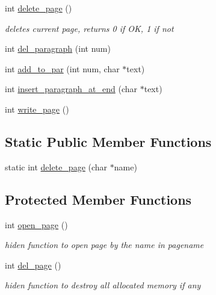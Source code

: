 \begin{DoxyCompactItemize}
\mbox{\label{classpage_ad3851ad84faf2677e8a50087e0627509}} 
int \hyperlink{classpage_ad3851ad84faf2677e8a50087e0627509}{delete\+\_\+page} ()
\begin{DoxyCompactList}\small\item\em deletes current page, returns 0 if OK, 1 if not \end{DoxyCompactList}\item 
int \hyperlink{classpage_a1c55a90abfcc823c8216c9dad7660f24}{del\+\_\+paragraph} (int num)
\item 
int \hyperlink{classpage_a03e597adceb2d5147a1729d6517df5b4}{add\+\_\+to\+\_\+par} (int num, char $\ast$text)
\item 
int \hyperlink{classpage_a5182baae92ba16e0d8ac1c1b97cda5c0}{insert\+\_\+paragraph\+\_\+at\+\_\+end} (char $\ast$text)
\item 
int \hyperlink{classpage_a5cbc74c74b3b2296bc76fe5496cff59f}{write\+\_\+page} ()
\end{DoxyCompactItemize}
\subsection*{Static Public Member Functions}
\begin{DoxyCompactItemize}
\item 
static int \hyperlink{classpage_a4030e9084e093da1687ed0a0ff34c9d2}{delete\+\_\+page} (char $\ast$name)
\end{DoxyCompactItemize}
\subsection*{Protected Member Functions}
\begin{DoxyCompactItemize}
\item 
int \hyperlink{classpage_af3155afb8335de30b52d4280f390c398}{open\+\_\+page} ()
\begin{DoxyCompactList}\small\item\em hiden function to open page by the name in pagename \end{DoxyCompactList}\item 
int \hyperlink{classpage_acb20752136c88c804d6f3f6ef0569737}{del\+\_\+page} ()
\begin{DoxyCompactList}\small\item\em hiden function to destroy all allocated memory if any \end{DoxyCompactList}\end{DoxyCompactItemize}
